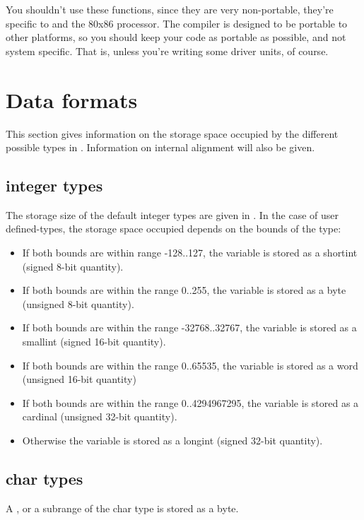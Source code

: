 You shouldn't use these functions, since they are very non-portable, they're
specific to \dos and the 80x86 processor. The \fpc compiler is designed to be
portable to other platforms, so you should keep your code as portable as
possible, and not system specific. That is, unless you're writing some driver
units, of course.

\section{Data formats}
\label{se:Dataformats}

This section gives information on the storage space occupied by
the different possible types in \fpc. Information on internal
alignment will also be given.

\subsection{integer types}

The storage size of the default integer types are given in
. In the case of user defined-types, the storage space
occupied depends on the bounds of the type:

\begin{itemize}
\item If both bounds are within range -128..127, the variable
is stored as a shortint (signed 8-bit quantity).
\item If both bounds are within the range 0..255, the variable
is stored as a byte (unsigned 8-bit quantity).
\item If both bounds are within the range -32768..32767, the variable
is stored as a smallint (signed 16-bit quantity).
\item If both bounds are within the range 0..65535, the variable
is stored as a word (unsigned 16-bit quantity)
\item If both bounds are within the range 0..4294967295, the
variable is stored as a cardinal (unsigned 32-bit quantity).
\item Otherwise the variable is stored as a longint (signed
32-bit quantity).
\end{itemize}

\subsection{char types}

A , or a subrange of the char type is stored
as a byte.

